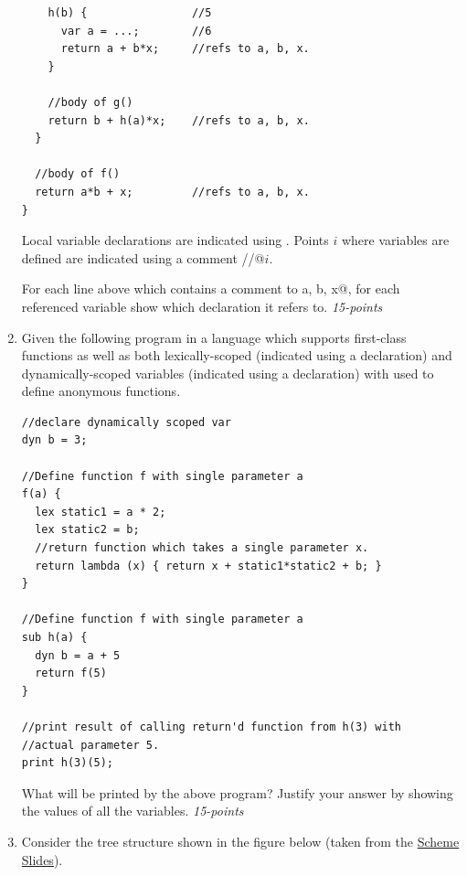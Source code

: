 \documentclass[12pt]{article}
\begin{document}
\begin{enumerate}
\begin{verbatim}
    h(b) {                //5
      var a = ...;        //6
      return a + b*x;     //refs to a, b, x.
    }
  
    //body of g()
    return b + h(a)*x;    //refs to a, b, x.
  }

  //body of f()
  return a*b + x;         //refs to a, b, x.
}
\end{verbatim}

Local variable declarations are indicated using \verb@var@.  Points
$i$ where variables are defined are indicated using a comment
\verb@//@$i$.

For each line above which contains a comment \verb@refs to a, b, x@,
for each referenced variable show which declaration it refers to.
\hfill{\textit{15-points}}

\item Given the following program in a language which supports
 first-class functions as well as both lexically-scoped (indicated
 using a \verb@lex@ declaration) and dynamically-scoped variables
 (indicated using a \verb@dyn@ declaration) with \verb@lambda@ used to
 define anonymous functions.

\begin{verbatim}
//declare dynamically scoped var
dyn b = 3;

//Define function f with single parameter a
f(a) {
  lex static1 = a * 2; 
  lex static2 = b; 
  //return function which takes a single parameter x.
  return lambda (x) { return x + static1*static2 + b; }
}

//Define function f with single parameter a
sub h(a) {
  dyn b = a + 5
  return f(5)
}

//print result of calling return'd function from h(3) with 
//actual parameter 5.
print h(3)(5);

\end{verbatim}

What will be printed by the above program?  Justify your answer by showing the
values of all the variables.  \hfill{\textit{15-points}}
  
\item Consider the tree structure shown in the figure below (taken from the \href{http://zdu.binghamton.edu/cs571-16f/slides/scheme/scheme.pdf}{Scheme Slides}).


\end{enumerate}
\end{document}
